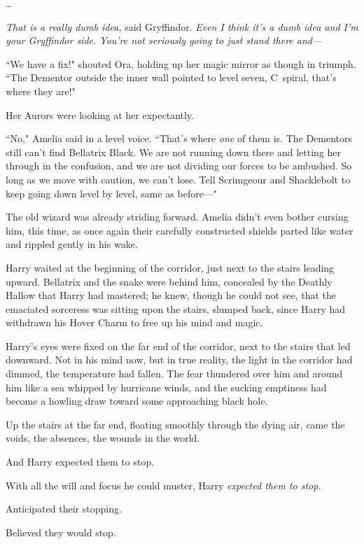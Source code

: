 {\ldots}

\emph{That is a really dumb idea,} said Gryffindor. \emph{Even I think it's a dumb idea and I'm your Gryffindor side. You're not seriously going to just stand there and---}

\later

``We have a fix!" shouted Ora, holding up her magic mirror as though in triumph. ``The Dementor outside the inner wall pointed to level seven, C~spiral, that's where they are!"

Her Aurors were looking at her expectantly.

``No," Amelia said in a level voice. ``That's where \emph{one} of them is. The Dementors still can't find Bellatrix Black. We are not running down there and letting her through in the confusion, and we are not dividing our forces to be ambushed. So long as we move with caution, we can't lose. Tell Scrimgeour and Shacklebolt to keep going down level by level, same as before---"

The old wizard was already striding forward. Amelia didn't even bother cursing him, this time, as once again their carefully constructed shields parted like water and rippled gently in his wake.

\later

Harry waited at the beginning of the corridor, just next to the stairs leading upward. Bellatrix and the snake were behind him, concealed by the Deathly Hallow that Harry had mastered; he knew, though he could not see, that the emaciated sorceress was sitting upon the stairs, slumped back, since Harry had withdrawn his Hover Charm to free up his mind and magic.

Harry's eyes were fixed on the far end of the corridor, next to the stairs that led downward. Not in his mind now, but in true reality, the light in the corridor had dimmed, the temperature had fallen. The fear thundered over him and around him like a sea whipped by hurricane winds, and the sucking emptiness had become a howling draw toward some approaching black hole.

Up the stairs at the far end, floating smoothly through the dying air, came the voids, the absences, the wounds in the world.

And Harry expected them to stop.

With all the will and focus he could muster, Harry \emph{expected them to stop}.

Anticipated their stopping.

Believed they would stop.

